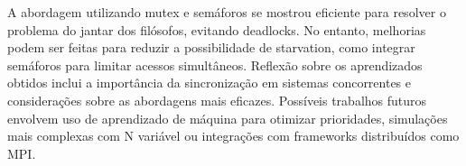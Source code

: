 A abordagem utilizando mutex e semáforos se mostrou eficiente para resolver o problema do jantar dos filósofos, evitando deadlocks. No entanto, melhorias podem ser feitas para reduzir a possibilidade de starvation, como integrar semáforos para limitar acessos simultâneos. Reflexão sobre os aprendizados obtidos inclui a importância da sincronização em sistemas concorrentes e considerações sobre as abordagens mais eficazes. Possíveis trabalhos futuros envolvem uso de aprendizado de máquina para otimizar prioridades, simulações mais complexas com N variável ou integrações com frameworks distribuídos como MPI.